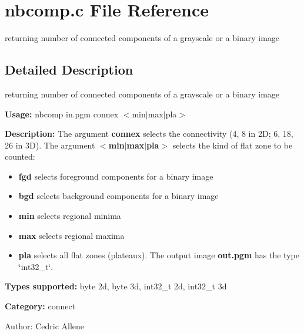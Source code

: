 \section{nbcomp.c File Reference}
\label{nbcomp_8c}
returning number of connected components of a grayscale or a binary image 



\subsection{Detailed Description}
returning number of connected components of a grayscale or a binary image 

{\bf Usage:} nbcomp in.pgm connex $<$min$|$max$|$pla$>$

{\bf Description:} The argument {\bf connex} selects the connectivity (4, 8 in 2D; 6, 18, 26 in 3D). The argument {\bf $<$min$|$max$|$pla$>$} selects the kind of flat zone to be counted: \begin{itemize}
\item {\bf fgd} selects foreground components for a binary image \item {\bf bgd} selects background components for a binary image \item {\bf min} selects regional minima \item {\bf max} selects regional maxima \item {\bf pla} selects all flat zones (plateaux). The output image {\bf out.pgm} has the type \char`\"{}int32\_\-t\char`\"{}.\end{itemize}
{\bf Types supported:} byte 2d, byte 3d, int32\_\-t 2d, int32\_\-t 3d

{\bf Category:} connect

\begin{Desc}
\item[Author:]Cedric Allene \end{Desc}
